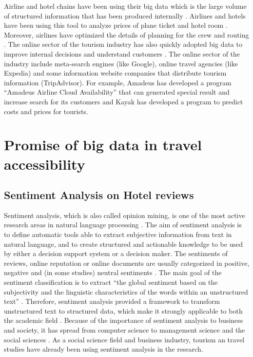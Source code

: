 \documentclass[sigconf]{acmart}
\begin{document}
Airline and hotel chains have been using their big data which is the large volume of
structured information that has been produced internally \cite{MIAH2017}. Airlines and
hotels have been using this tool to analyze prices of plane ticket and hotel room
\cite{GJT14}. Moreover, airlines have optimized the details of planning for the crew and
routing \cite{Shafiee16, GJT14}. The online sector of the tourism industry has also
quickly adopted big data to improve internal decisions and understand customers 
\cite{akerkar2012}. The online sector of the industry include  meta-search engines (like 
Google), online travel agencies (like Expedia) and some information website companies that
distribute tourism information (TripAdvisor)\cite{MIAH2017}. For example, Amadeus has 
developed a program ``Amadeus Airline Cloud Availability'' that can generated special 
result and increase search for its customers and Kayak has developed a program to predict 
costs and prices for tourists\cite{Shafiee16}.

\section{Promise of big data in travel accessibility}

\subsection{Sentiment Analysis on Hotel reviews}
Sentiment analysis, which is also called opinion mining, is one of the most active
research areas in natural language processing \cite{opinion2014}. The aim of sentiment analysis is to define automatic tools able to extract subjective information from text in natural \cite{article} language, and to create structured and actionable knowledge to be used by either a decision support system or a decision maker. The sentiments of reviews, online reputation or online documents are usually categorized in positive, negative and (in some studies) neutral sentiments \cite{Garcia2012}. The main goal of the sentiment classification is to extract ``the global sentiment based on the subjectivity and the linguistic characteristics of the words within an unstructured text'' \cite{Garcia2012}. Therefore, sentiment analysis provided a framework to transform unstructured text to structured data, which make it strongly applicable to both the academic field \cite{Cam2013}. Because of the importance of sentiment analysis to business and society, it has spread from computer science to management science and the social sciences \cite{Pozzi}. As a social science field and business industry, tourism an travel studies have already been using sentiment analysis in the research.
\end{document}
